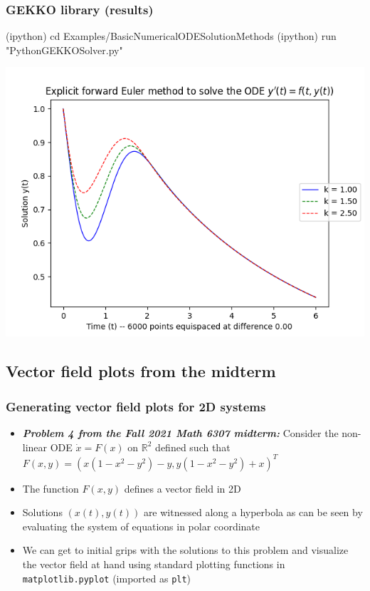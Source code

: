 \documentclass[usenames,svgnames,dvipsnames,10pt]{beamer}
\begin{document}
\begin{frame}[fragile]
\frametitle{GEKKO library (results)}

\begin{center}
\begin{code}
(ipython) cd Examples/BasicNumericalODESolutionMethods
(ipython) run "PythonGEKKOSolver.py"
\end{code}
\vskip -0.205cm
\includegraphics[height=0.76\textheight]{../Images/GEKKOPlotOutputs-v1.png}
\end{center}

\end{frame}


\subsection{Vector field plots from the midterm} 

\begin{frame}
\frametitle{Generating vector field plots for 2D systems}

\begin{itemize} 

\item \emph{\textbf{Problem 4 from the Fall 2021 Math 6307 midterm:}} 
      Consider the non-linear ODE $\dot{x} = F(x)$ on $\mathbb{R}^2$ defined such that 
      $F(x, y) = \left(x(1-x^2-y^2)-y, y(1-x^2-y^2)+x\right)^T$
\item The function $F(x, y)$ defines a vector field in 2D 
\item Solutions $(x(t), y(t))$ are witnessed along a hyperbola as can be seen by evaluating the 
      system of equations in polar coordinate 
\item We can get to initial grips with the solutions to this problem and 
      visualize the vector field at hand using standard plotting functions in 
      \texttt{matplotlib.pyplot} (imported as \texttt{plt}) 

\end{itemize} 

\end{frame}
\end{document}
